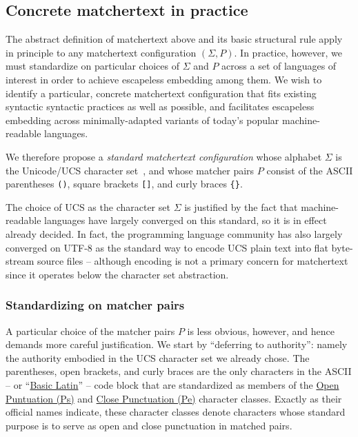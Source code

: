 \subsection{Concrete matchertext in practice}
\label{sec:design:concrete}

The abstract definition of matchertext above
and its basic structural rule apply in principle
to any matchertext configuration $(\Sigma,P)$.
In practice, however,
we must standardize on particular choices of $\Sigma$ and $P$
across a set of languages of interest
in order to achieve escapeless embedding among them.
We wish to identify a particular, concrete matchertext configuration
that fits existing syntactic syntactic practices as well as possible,
and facilitates escapeless embedding across 
minimally-adapted variants of today's popular machine-readable languages.

We therefore propose a \emph{standard matchertext configuration}
whose alphabet $\Sigma$ is the Unicode/UCS character set~\cite{iso10646ucs},
and whose matcher pairs $P$ consist of
the ASCII parentheses \verb|()|,
square brackets \verb|[]|,
and curly braces \verb|{}|.

The choice of UCS as the character set $\Sigma$
is justified by the fact that machine-readable languages
have largely converged on this standard,
so it is in effect already decided.
In fact, the programming language community has also largely converged
on UTF-8 as the standard way to encode UCS plain text
into flat byte-stream source files --
although encoding is not a primary concern for matchertext
since it operates below the character set abstraction.

\subsubsection{Standardizing on matcher pairs}
\label{sec:design:concrete:standard}

A particular choice of the matcher pairs $P$ is less obvious, however,
and hence demands more careful justification.
We start by ``deferring to authority'':
namely the authority embodied in
the UCS character set we already chose.
The parentheses, open brackets, and curly braces
are the only characters in the ASCII --
or ``\href{https://www.compart.com/en/unicode/block/U+0000}{Basic Latin}'' -- 
code block that are standardized as members of the
\href{https://www.compart.com/en/unicode/category/Ps}{Open Puntuation (Ps)}
and 
\href{https://www.compart.com/en/unicode/category/Pe}{Close Punctuation (Pe)}
character classes.
Exactly as their official names indicate,
these character classes denote characters whose standard purpose
is to serve as open and close punctuation in matched pairs.

